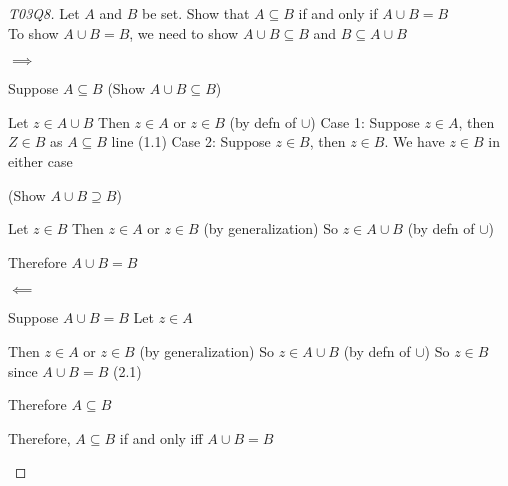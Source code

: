 \documentclass[a4paper]{article}
\theoremstyle{definition}
\begin{document}
\begin{proof}[\proofname T03Q8] Let $A$ and $B$ be set. Show that $A \subseteq B$ if and only if $A \cup B = B$\\
  To show $A \cup B = B$, we need to show $A \cup B \subseteq B$ and $B \subseteq A \cup B$
  \begin{numpf*}
    \pfln $\implies$
    \begin{subpf}
      \pfln Suppose $A \subseteq B$
      \pfln (Show $A \cup B \subseteq B$)
      \begin{subpf}
        \pfln Let $z \in A \cup B$
        \pfln Then $z \in A$ or $z \in B$ (by defn of $\cup$)
        \pfln Case 1: Suppose $z \in A$, then $Z \in B$ as $A \subseteq B$ line (1.1)
        \pfln Case 2: Suppose $z \in B$, then $z \in B$. We have $z\in B$ in either case
      \end{subpf}
      \pfln (Show  $A \cup B \supseteq B$)
      \begin{subpf}
        \pfln Let $z \in B$
        \pfln Then $z \in A$ or $z \in B$ (by generalization)
        \pfln So $z \in A \cup B$ (by defn of $\cup$)
      \end{subpf}
      \pfln Therefore $A \cup B = B$
    \end{subpf}
    \pfln $\impliedby$
    \begin{subpf}
      \pfln Suppose $A \cup B = B$
      \pfln Let $z \in A$
      \begin{subpf}
        \pfln Then $z \in A$ or $z \in B$ (by generalization)
        \pfln So $z \in A \cup B$ (by defn of $\cup$)
        \pfln So $z \in B$ since $A \cup B = B$ (2.1)
      \end{subpf}
      \pfln Therefore $A \subseteq B$
    \end{subpf}
    \pfln Therefore, $A \subseteq B$ if and only iff $A \cup B = B$
  \end{numpf*}
\end{proof}
\end{document}
